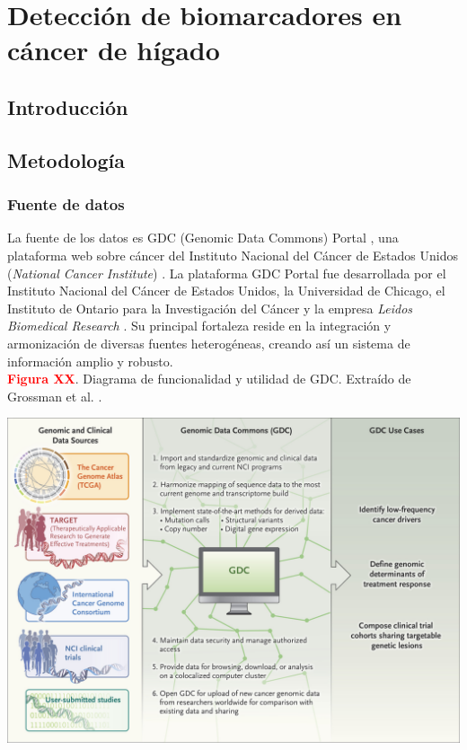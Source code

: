 \chapter{Detección de biomarcadores en cáncer de hígado}

\section{Introducción}

\section{Metodología}

\subsection{Fuente de datos}

La fuente de los datos es GDC (Genomic Data Commons) Portal \cite{GDCPortal}, una plataforma web sobre cáncer del Instituto Nacional del Cáncer de Estados Unidos (\textit{National Cancer Institute}) \cite{NationalCancerInstitute}. La plataforma GDC Portal fue desarrollada por el Instituto Nacional del Cáncer de Estados Unidos, la Universidad de Chicago, el Instituto de Ontario para la Investigación del Cáncer y la empresa \textit{Leidos Biomedical Research} \cite{Grossman2016}. Su principal fortaleza reside en la integración y armonización de diversas fuentes heterogéneas, creando así un sistema de información amplio y robusto. \\

\newpage
\textbf{\textcolor{red}{Figura XX}}. Diagrama de funcionalidad y utilidad de GDC. Extraído de Grossman et al. \cite{Grossman2016}.
\begin{center}
	\includegraphics[width=1\textwidth]{figuras/funcionamiento_gdc.jpeg} \\
\end{center}

